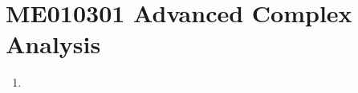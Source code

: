 
\chapter{ME010301 Advanced Complex Analysis}
\begin{enumerate}[label=Week \arabic*]
	\item 
\end{enumerate}
